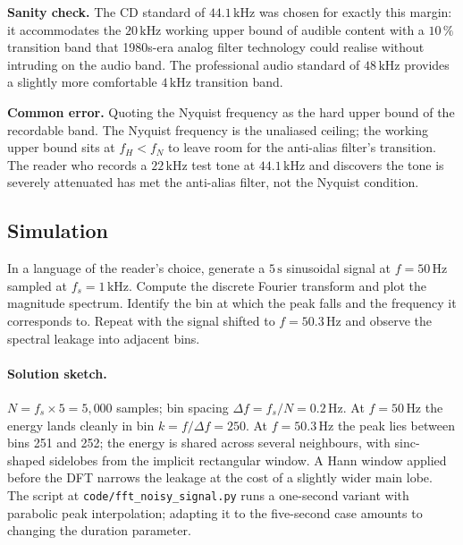 \begin{exercise}
\textbf{Sanity check.} The CD standard of $44.1 \,\si{\kilo
\hertz}$ was chosen for exactly this margin: it accommodates the
$20 \,\si{\kilo\hertz}$ working upper bound of audible content
with a $10\,\%$ transition band that 1980s-era analog filter
technology could realise without intruding on the audio band.
The professional audio standard of $48 \,\si{\kilo\hertz}$
provides a slightly more comfortable $4 \,\si{\kilo\hertz}$
transition band.

\textbf{Common error.} Quoting the Nyquist frequency as the
hard upper bound of the recordable band. The Nyquist frequency
is the unaliased ceiling; the working upper bound sits at $f_{H}
< f_{N}$ to leave room for the anti-alias filter's transition.
The reader who records a $22 \,\si{\kilo\hertz}$ test tone at
$44.1 \,\si{\kilo\hertz}$ and discovers the tone is severely
attenuated has met the anti-alias filter, not the Nyquist
condition.
\end{exercise}

\subsection*{Simulation}

\begin{exercise}
In a language of the reader's choice, generate a $5 \,\si{\second}$
sinusoidal signal at $f = 50 \,\si{\hertz}$ sampled at $f_{s} =
1 \,\si{\kilo\hertz}$. Compute the discrete Fourier transform and
plot the magnitude spectrum. Identify the bin at which the peak
falls and the frequency it corresponds to. Repeat with the signal
shifted to $f = 50.3 \,\si{\hertz}$ and observe the spectral
leakage into adjacent bins.

\paragraph{Solution sketch.}
$N = f_{s} \times 5 = 5{,}000$ samples; bin spacing $\Delta f =
f_{s}/N = 0.2 \,\si{\hertz}$. At $f = 50 \,\si{\hertz}$ the
energy lands cleanly in bin $k = f / \Delta f = 250$. At $f =
50.3 \,\si{\hertz}$ the peak lies between bins 251 and 252; the
energy is shared across several neighbours, with sinc-shaped
sidelobes from the implicit rectangular window. A Hann window
applied before the DFT narrows the leakage at the cost of a
slightly wider main lobe. The script at
\texttt{code/fft\_noisy\_signal.py} runs a one-second variant with
parabolic peak interpolation; adapting it to the five-second case
amounts to changing the duration parameter.
\end{exercise}

